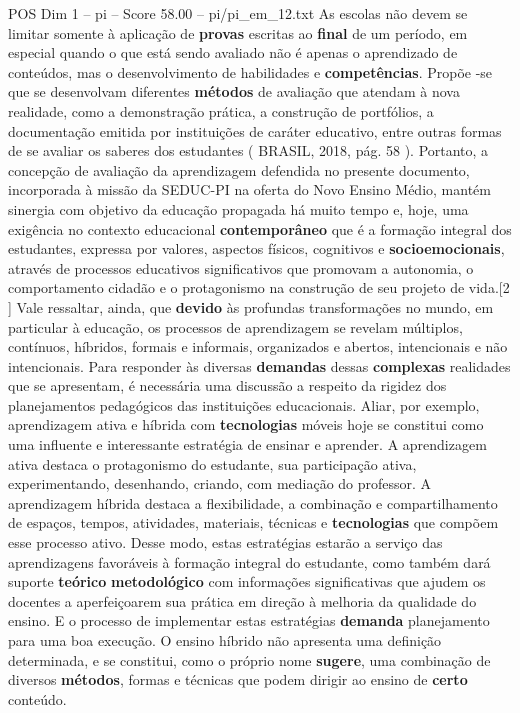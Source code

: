 \begin{textsample}{POS Dim 1 – pi – Score 58.00 – pi/pi\_em\_12.txt}
As escolas não devem se limitar somente à aplicação de \textbf{provas} escritas ao \textbf{final} de um período, em especial quando o que está sendo avaliado não é apenas o aprendizado de conteúdos, mas o desenvolvimento de habilidades e \textbf{competências}.
Propõe -se que se desenvolvam diferentes \textbf{métodos} de avaliação que atendam à nova realidade, como a demonstração prática, a construção de portfólios, a documentação emitida por instituições de caráter educativo, entre outras formas de se avaliar os saberes dos estudantes ( BRASIL, 2018, pág. 58 ).
Portanto, a concepção de avaliação da aprendizagem defendida no presente documento, incorporada à missão da SEDUC-PI na oferta do Novo Ensino Médio, mantém sinergia com objetivo da educação propagada há muito tempo e, hoje, uma exigência no contexto educacional \textbf{contemporâneo} que é a formação integral dos estudantes, expressa por valores, aspectos físicos, cognitivos e \textbf{socioemocionais}, através de processos educativos significativos que promovam a autonomia, o comportamento cidadão e o protagonismo na construção de seu projeto de vida.[2 ] Vale ressaltar, ainda, que \textbf{devido} às profundas transformações no mundo, em particular à educação, os processos de aprendizagem se revelam múltiplos, contínuos, híbridos, formais e informais, organizados e abertos, intencionais e não intencionais.
Para responder às diversas \textbf{demandas} dessas \textbf{complexas} realidades que se apresentam, é necessária uma discussão a respeito da rigidez dos planejamentos pedagógicos das instituições educacionais.
Aliar, por exemplo, aprendizagem ativa e híbrida com \textbf{tecnologias} móveis hoje se constitui como uma influente e interessante estratégia de ensinar e aprender.
A aprendizagem ativa destaca o protagonismo do estudante, sua participação ativa, experimentando, desenhando, criando, com mediação do professor.
A aprendizagem híbrida destaca a flexibilidade, a combinação e compartilhamento de espaços, tempos, atividades, materiais, técnicas e \textbf{tecnologias} que compõem esse processo ativo.
Desse modo, estas estratégias estarão a serviço das aprendizagens favoráveis à formação integral do estudante, como também dará suporte \textbf{teórico} \textbf{metodológico} com informações significativas que ajudem os docentes a aperfeiçoarem sua prática em direção à melhoria da qualidade do ensino.
E o processo de implementar estas estratégias \textbf{demanda} planejamento para uma boa execução.
O ensino híbrido não apresenta uma definição determinada, e se constitui, como o próprio nome \textbf{sugere}, uma combinação de diversos \textbf{métodos}, formas e técnicas que podem dirigir ao ensino de \textbf{certo} conteúdo.

\end{textsample}
